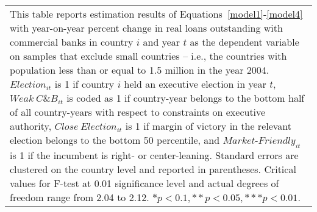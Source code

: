 \begin{longtable}{m{4cm}*{12}{c}}
\bottomrule                                          \multicolumn{13}{m{\linewidth}}{\footnotesize This table reports estimation results of Equations~\eqref{model1}-\eqref{model4} with year-on-year percent change in real loans outstanding with commercial banks in country $ i $ and year $ t $ as the dependent variable on samples that exclude small countries -- i.e., the countries with population less than or equal to 1.5 million in the year 2004. $ Election_{it} $ is 1 if country $ i $ held an executive election in year $ t $, $ Weak\ C\&B_{it} $ is coded as 1 if country-year belongs to the bottom half of all country-years with respect to constraints on executive authority, $ Close\ Election_{it} $ is 1 if margin of victory in the relevant election belongs to the bottom 50 percentile, and $ Market\text{-}Friendly_{it} $ is 1 if the incumbent is right- or center-leaning. Standard errors are clustered on the country level and reported in parentheses. Critical values for F-test at 0.01 significance level and actual degrees of freedom range from 2.04 to 2.12. \( * p<0.1, ** p<0.05, *** p<0.01 \). }\\                                          \end{longtable}
